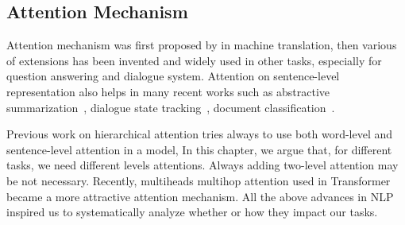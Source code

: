 \subsection{Attention Mechanism}
\label{ssec:sentential:attention}

Attention mechanism was first proposed by \citet{bahdanau2014neural}
in machine translation, then various of extensions has been invented
and widely used in other tasks, especially for question answering and
dialogue
system\cite{matchlstm,bidaf,sukhbaatar15mnet,fei17gmnet,P18-1157}.
Attention on sentence-level representation also helps in many recent
works such as abstractive summarization~\cite{P18-1013}, dialogue
state tracking~\cite{zhou2018multi,zhou2016multi}, document
classification~\cite{yang2016hierarchical}.

Previous work on hierarchical attention\cite{yang2016hierarchical}
tries always to use both word-level and sentence-level attention in a
model, In this chapter, we argue that, for different tasks, we need
different levels attentions. Always adding two-level attention may be
not necessary. Recently, multiheads multihop attention used in
Transformer \cite{NIPS2017_7181} became a more attractive attention
mechanism. All the above advances in NLP inspired us to systematically
analyze whether or how they impact our tasks.

